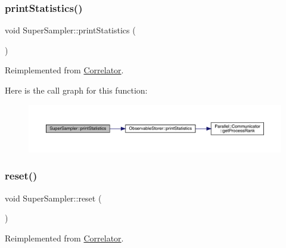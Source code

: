 \subsubsection{\texorpdfstring{printStatistics()}{printStatistics()}}
{\footnotesize\ttfamily void Super\+Sampler\+::print\+Statistics (\begin{DoxyParamCaption}{ }\end{DoxyParamCaption})\hspace{0.3cm}{\ttfamily [virtual]}}



Reimplemented from \mbox{\hyperlink{class_correlator_a2168d677f547769784781d2e2aaa53cf}{Correlator}}.

Here is the call graph for this function\+:\nopagebreak
\begin{figure}[H]
\begin{center}
\leavevmode
\includegraphics[width=350pt]{class_super_sampler_a04b230314ae446c77172c97ff52cf4f3_cgraph}
\end{center}
\end{figure}
\mbox{\label{class_super_sampler_ab2f028561e015500fac1e3093aa4a725}} 
\subsubsection{\texorpdfstring{reset()}{reset()}}
{\footnotesize\ttfamily void Super\+Sampler\+::reset (\begin{DoxyParamCaption}{ }\end{DoxyParamCaption})\hspace{0.3cm}{\ttfamily [virtual]}}



Reimplemented from \mbox{\hyperlink{class_correlator_aacca40262d2cd62f0a3964e832f948c1}{Correlator}}.

